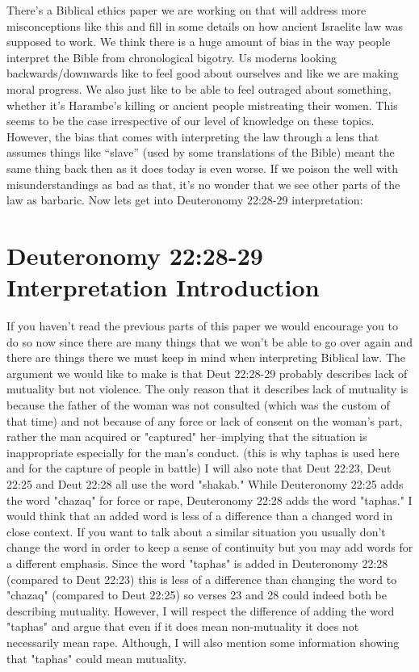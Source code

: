 \documentclass[11pt]{article}
\begin{document}
There’s a Biblical ethics paper we are working on that will address more misconceptions like this and fill in some details on how ancient Israelite law was supposed to work. We think there is a huge amount of bias in the way people interpret the Bible from chronological bigotry. Us moderns looking backwards/downwards like to feel good about ourselves and like we are making moral progress. We also just like to be able to feel outraged about something, whether it’s Harambe’s killing or ancient people mistreating their women. This seems to be the case irrespective of our level of knowledge on these topics. However, the bias that comes with interpreting the law through a lens that assumes things like “slave” (used by some translations of the Bible) meant the same thing back then as it does today is even worse. If we poison the well with misunderstandings as bad as that, it’s no wonder that we see other parts of the law as barbaric. Now lets get into Deuteronomy 22:28-29 interpretation:

\section{Deuteronomy 22:28-29 Interpretation Introduction}
If you haven't read the previous parts of this paper we would encourage you to do so now since there are many things that we won't be able to go over again and there are things there we must keep in mind when interpreting Biblical law. The argument we would like to make is that Deut 22:28-29 probably describes lack of mutuality but not violence. The only reason that it describes lack of mutuality is because the father of the woman was not consulted (which was the custom of that time) and not because of any force or lack of consent on the woman's part, rather the man acquired or "captured" her--implying that the situation is inappropriate especially for the man's conduct. (this is why taphas is used here and for the capture of people in battle) I will also note that Deut 22:23, Deut 22:25 and Deut 22:28 all use the word "shakab." While Deuteronomy 22:25 adds the word "chazaq" for force or rape, Deuteronomy 22:28 adds the word "taphas." I would think that an added word is less of a difference than a changed word in close context. If you want to talk about a similar situation you usually don't change the word in order to keep a sense of continuity but you may add words for a different emphasis. Since the word "taphas" is added in Deuteronomy 22:28 (compared to Deut 22:23) this is less of a difference than changing the word to "chazaq" (compared to Deut 22:25) so verses 23 and 28 could indeed both be describing mutuality. However, I will respect the difference of adding the word "taphas" and argue that even if it does mean non-mutuality it does not necessarily mean rape. Although, I will also mention some information showing that "taphas" could mean mutuality.
\end{document}
